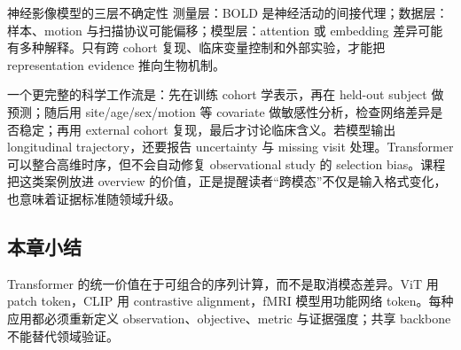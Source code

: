 


\begin{warningbox}{神经影像模型的三层不确定性}
测量层：BOLD 是神经活动的间接代理；数据层：样本、motion 与扫描协议可能偏移；模型层：attention 或 embedding 差异可能有多种解释。只有跨 cohort 复现、临床变量控制和外部实验，才能把 representation evidence 推向生物机制。
\end{warningbox}

一个更完整的科学工作流是：先在训练 cohort 学表示，再在 held-out subject 做预测；随后用 site/age/sex/motion 等 covariate 做敏感性分析，检查网络差异是否稳定；再用 external cohort 复现，最后才讨论临床含义。若模型输出 longitudinal trajectory，还要报告 uncertainty 与 missing visit 处理。Transformer 可以整合高维时序，但不会自动修复 observational study 的 selection bias。课程把这类案例放进 overview 的价值，正是提醒读者“跨模态”不仅是输入格式变化，也意味着证据标准随领域升级。

\subsection{本章小结}

Transformer 的统一价值在于可组合的序列计算，而不是取消模态差异。ViT 用 patch token，CLIP 用 contrastive alignment，fMRI 模型用功能网络 token。每种应用都必须重新定义 observation、objective、metric 与证据强度；共享 backbone 不能替代领域验证。

